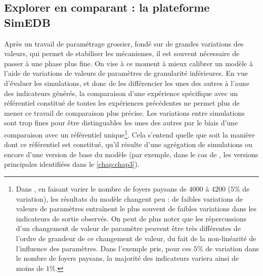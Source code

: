 \subsection[Explorer en comparant : la plateforme SimEDB]{Explorer en comparant : la plateforme SimEDB\footnotemark}\label{subsec:explorer-simedb}
Après un travail de paramétrage grossier, fondé sur de grandes variations des valeurs, qui permet de stabiliser les mécanismes, il est souvent nécessaire de passer à une phase plus fine.
On vise à ce moment à mieux calibrer un modèle à l'aide de variations de valeurs de paramètres de granularité inférieures.
En vue d'évaluer les simulations, et donc de les différencier les unes des autres à l'aune des indicateurs générés, la comparaison d'une expérience spécifique avec un référentiel constitué de toutes les expériences précédentes ne permet plus de mener ce travail de comparaison plus précise.
Les variations entre simulations sont trop fines pour être distinguables les unes des autres par le biais d'une comparaison avec un référentiel unique\footnote{
	Dans \simfeodal{}, en faisant varier le nombre de foyers paysans de $4000$ à $4200$ ($5\%$ de variation), les résultats du modèle changent peu : de faibles variations de valeurs de paramètres entraînent le plus souvent de faibles variations dans les indicateurs de sortie observés.
	On peut de plus noter que les répercussions d'un changement de valeur de paramètre peuvent être très différentes de l'ordre de grandeur de ce changement de valeur, du fait de la non-linéarité de l'influence des paramètres.
	Dans l'exemple pris, pour ces $5\%$ de variation dans le nombre de foyers paysans, la majorité des indicateurs variera ainsi de moins de $1\%$.
}.
Cela s'entend quelle que soit la manière dont ce référentiel est constitué, qu'il résulte d'une agrégation de simulations ou encore d'une version \og de base\fg{} du modèle (par exemple, dans le cas de \simfeodal{}, les versions principales identifiées dans le \cref{chap:chap3}).



